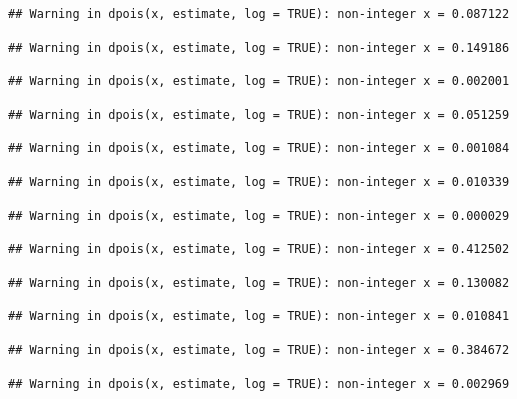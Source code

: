 \documentclass[]{article}
\begin{document}
\begin{verbatim}
## Warning in dpois(x, estimate, log = TRUE): non-integer x = 0.087122
\end{verbatim}

\begin{verbatim}
## Warning in dpois(x, estimate, log = TRUE): non-integer x = 0.149186
\end{verbatim}

\begin{verbatim}
## Warning in dpois(x, estimate, log = TRUE): non-integer x = 0.002001
\end{verbatim}

\begin{verbatim}
## Warning in dpois(x, estimate, log = TRUE): non-integer x = 0.051259
\end{verbatim}

\begin{verbatim}
## Warning in dpois(x, estimate, log = TRUE): non-integer x = 0.001084
\end{verbatim}

\begin{verbatim}
## Warning in dpois(x, estimate, log = TRUE): non-integer x = 0.010339
\end{verbatim}

\begin{verbatim}
## Warning in dpois(x, estimate, log = TRUE): non-integer x = 0.000029
\end{verbatim}

\begin{verbatim}
## Warning in dpois(x, estimate, log = TRUE): non-integer x = 0.412502
\end{verbatim}

\begin{verbatim}
## Warning in dpois(x, estimate, log = TRUE): non-integer x = 0.130082
\end{verbatim}

\begin{verbatim}
## Warning in dpois(x, estimate, log = TRUE): non-integer x = 0.010841
\end{verbatim}

\begin{verbatim}
## Warning in dpois(x, estimate, log = TRUE): non-integer x = 0.384672
\end{verbatim}

\begin{verbatim}
## Warning in dpois(x, estimate, log = TRUE): non-integer x = 0.002969
\end{verbatim}
\end{document}
